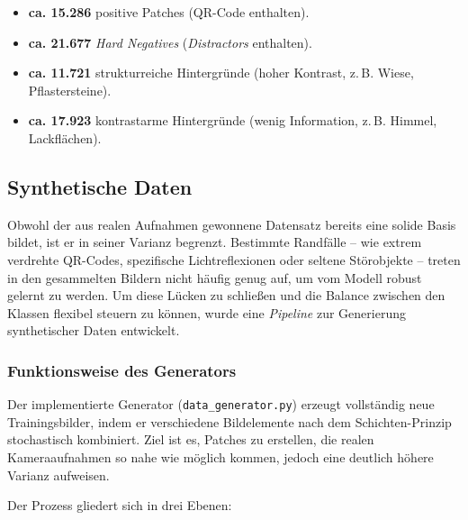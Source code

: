 \documentclass[
    a4paper,        %
    11pt,           %
    ngerman,        %
    parskip=half,   %
    listof=totoc,   %
    bibliography=totoc %
]{scrartcl}
\begin{document}
\begin{itemize}
    \item \textbf{ca. 15.286} positive Patches (QR-Code enthalten).
    \item \textbf{ca. 21.677} \textit{Hard Negatives} (\textit{Distractors} enthalten).
    \item \textbf{ca. 11.721} strukturreiche Hintergründe (hoher Kontrast, z.\,B. Wiese, Pflastersteine).
    \item \textbf{ca. 17.923} kontrastarme Hintergründe (wenig Information, z.\,B. Himmel, Lackflächen).
\end{itemize}

\subsection{Synthetische Daten} \label{subsec:synthetische_daten}

Obwohl der aus realen Aufnahmen gewonnene Datensatz bereits eine solide Basis bildet, ist er in seiner Varianz begrenzt. Bestimmte Randfälle – wie extrem verdrehte QR-Codes, spezifische Lichtreflexionen oder seltene Störobjekte – treten in den gesammelten Bildern nicht häufig genug auf, um vom Modell robust gelernt zu werden.
Um diese Lücken zu schließen und die Balance zwischen den Klassen flexibel steuern zu können, wurde eine \textit{Pipeline} zur Generierung synthetischer Daten entwickelt.

\subsubsection{Funktionsweise des Generators} \label{subsubsec:funktion_daten_generator}
Der implementierte Generator (\texttt{data\_generator.py}) erzeugt vollständig neue Trainingsbilder, indem er verschiedene Bildelemente nach dem Schichten-Prinzip stochastisch kombiniert. Ziel ist es, Patches zu erstellen, die realen Kameraaufnahmen so nahe wie möglich kommen, jedoch eine deutlich höhere Varianz aufweisen.

Der Prozess gliedert sich in drei Ebenen:
\end{document}
